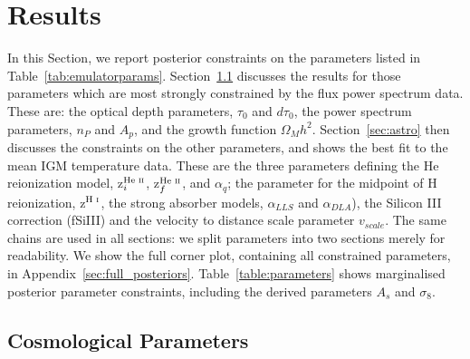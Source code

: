 \section{Results}\label{sec:results}

In this Section, we report posterior constraints on the parameters listed in Table~\ref{tab:emulatorparams}. Section~\ref{sec:cosmo} discusses the results for those parameters which are most strongly constrained by the flux power spectrum data. These are: the optical depth parameters, $\tau_0$ and $d\tau_0$, the power spectrum parameters, $n_P$ and $A_p$, and the growth function $\Omega_M h^2$. %
Section~\ref{sec:astro} then discusses the constraints on the other parameters, and shows the best fit to the mean IGM temperature data. These are the three parameters defining the He~{} reionization model, z$^{\text{He~{\sc ii}}}_i$, z$^{\text{He~{\sc ii}}}_f$, and $\alpha_q$; the parameter for the midpoint of H~{} reionization, z$^{\text{H~{\sc i}}}$, the strong absorber models, $\alpha_{LLS}$ and $\alpha_{DLA}$), the Silicon III correction (fSiIII) and the velocity to distance scale parameter $v_{scale}$.
The same chains are used in all sections: we split parameters into two sections merely for readability. We show the full corner plot, containing all constrained parameters, in Appendix~\ref{sec:full_posteriors}. Table~\ref{table:parameters} shows marginalised posterior parameter constraints, including the derived parameters $A_s$ and $\sigma_8$. 


\subsection{Cosmological Parameters}\label{sec:cosmo}


